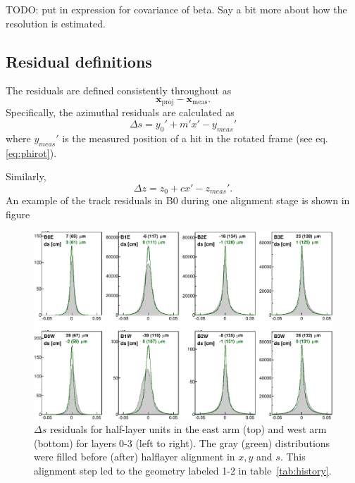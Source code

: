\documentclass[12pt]{article}
\begin{document}
TODO: put in expression for covariance of beta. Say a bit more about how the resolution is estimated.

\subsection{Residual definitions}
The residuals are defined consistently throughout as 
\begin{equation}\label{eq:resdef}
\mathbf{x}_{\mathrm{proj}} - \mathbf{x}_{\mathrm{meas}}.
\end{equation}
Specifically, the azimuthal residuals are calculated as
\begin{equation} \label{eq:ds}
\Delta s = y_0' + m' x' - y_{meas}'
\end{equation}
where $y_{meas}'$ is the measured position of a hit in the rotated frame (see eq. \ref{eq:phirot}). 

Similarly,
\begin{equation} \label{eq:dz}
\Delta z = z_0 + cx' - z_{meas}'.
\end{equation}
An example of the track residuals in B0 during one alignment stage is shown in figure
\begin{figure}[htb]
  \begin{center}
    \includegraphics[width=\textwidth]{11vs12/cls0}
  \end{center}
  \caption{$\Delta s$ residuals for half-layer units in the east arm (top) and west arm (bottom) for layers 0-3 (left to right). The gray (green) distributions were filled before (after) halflayer alignment in $x,y$ and $s$. This alignment step led to the geometry labeled 1-2 in table~\ref{tab:history}.}
  \label{fig:hlds}
\end{figure}
\end{document}
